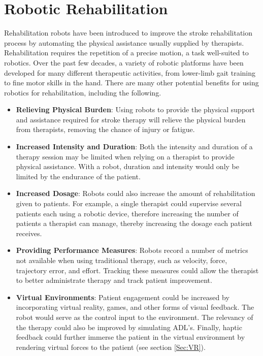 \documentclass[12pt]{report}
\begin{document}
\section{Robotic Rehabilitation}

	Rehabilitation robots have been introduced to improve the stroke rehabilitation process by automating the physical assistance usually supplied by therapists. Rehabilitation requires the repetition of a precise motion, a task well-suited to robotics. Over the past few decades, a variety of robotic platforms have been developed for many different therapeutic activities, from lower-limb gait training to fine motor skills in the hand. There are many other potential benefits for using robotics for rehabilitation, including the following.
\begin{itemize}
	\item \textbf{Relieving Physical Burden}: Using robots to provide the physical support and assistance required for stroke therapy will relieve the physical burden from therapists, removing the chance of injury or fatigue.
	\item \textbf{Increased Intensity and Duration}: Both the intensity and duration of a therapy session may be limited when relying on a therapist to provide physical assistance. With a robot, duration and intensity would only be limited by the endurance of the patient. 
	\item \textbf{Increased Dosage}: Robots could also increase the amount of rehabilitation given to patients. For example, a single therapist could supervise several patients each using a robotic device, therefore increasing the number of patients a therapist can manage, thereby increasing the dosage each patient receives.
	\item \textbf{Providing Performance Measures}: Robots record a number of metrics not available when using traditional therapy, such as velocity, force, trajectory error, and effort. Tracking these measures could allow the therapist to better administrate therapy and track patient improvement. 
	\item \textbf{Virtual Environments}: Patient engagement could be increased by incorporating virtual reality, games, and other forms of visual feedback. The robot would serve as the control input to the environment. The relevancy of the therapy could also be improved by simulating ADL's. Finally, haptic feedback could further immerse the patient in the virtual environment by rendering virtual forces to the patient (see section \ref{Sec:VR}).
\end{itemize}
	
\end{document}
